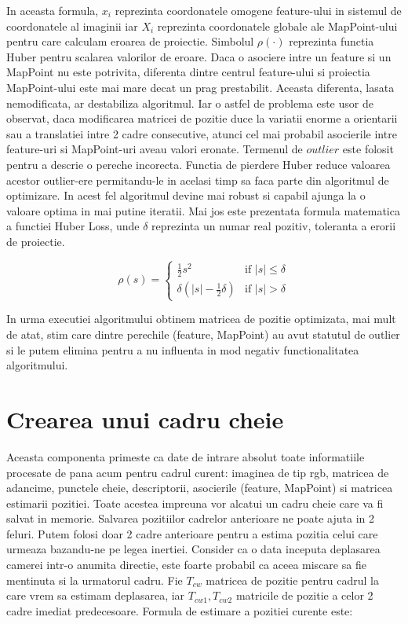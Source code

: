 \documentclass[12pt,a4paper]{report}
\begin{document}
In aceasta formula, \(x_i\) reprezinta coordonatele omogene feature-ului in sistemul de 
coordonatele al imaginii
iar \(X_i\) reprezinta coordonatele globale ale MapPoint-ului pentru care calculam eroarea
de proiectie. Simbolul $ \rho(\cdot) $ reprezinta functia Huber pentru scalarea valorilor de eroare.
Daca o asociere intre un feature si un MapPoint nu este potrivita, diferenta dintre centrul feature-ului
si proiectia MapPoint-ului este mai mare decat un prag prestabilit. Aceasta diferenta, lasata nemodificata,
ar destabiliza algoritmul. Iar o astfel de problema este usor de observat, daca modificarea matricei
de pozitie duce la variatii enorme a orientarii sau a translatiei intre 2 cadre consecutive, 
atunci cel mai probabil asocierile intre feature-uri si MapPoint-uri aveau valori eronate. 
Termenul de \(outlier\) este folosit pentru a descrie o pereche incorecta. Functia de pierdere Huber reduce 
valoarea acestor outlier-ere permitandu-le in acelasi timp sa faca parte din algoritmul de 
optimizare. In acest fel algoritmul devine mai robust si capabil ajunga la o valoare optima 
in mai putine iteratii. Mai jos este prezentata formula matematica a functiei Huber Loss, 
unde $ \delta $ reprezinta un numar real pozitiv, toleranta a erorii de proiectie. 

\begin{equation}
\rho(s) =
\begin{cases}
\frac{1}{2}s^2 & \text{if } |s| \leq \delta \\
\delta (|s| - \frac{1}{2}\delta) & \text{if } |s| > \delta
\end{cases}
\end{equation}

In urma executiei algoritmului obtinem matricea de pozitie optimizata, mai mult de atat,
stim care dintre perechile (feature, MapPoint) au avut statutul de outlier si le putem 
elimina pentru a nu influenta in mod negativ functionalitatea algoritmului.

\section{Crearea unui cadru cheie}
Aceasta componenta primeste ca date de intrare absolut toate informatiile procesate de 
pana acum pentru cadrul curent: imaginea de tip rgb, matricea de adancime, punctele cheie,
descriptorii, asocierile (feature, MapPoint) si matricea estimarii pozitiei. 
Toate acestea impreuna vor alcatui un cadru cheie care va fi salvat in memorie.
Salvarea pozitiilor cadrelor anterioare ne poate ajuta in 2 feluri. Putem folosi doar 2 
cadre anterioare pentru a estima pozitia celui care urmeaza bazandu-ne pe legea inertiei. 
Consider ca o data inceputa deplasarea camerei intr-o anumita directie, este foarte 
probabil ca aceea miscare sa fie mentinuta si la urmatorul cadru. Fie \(T_{cw}\) matricea de 
pozitie pentru cadrul la care vrem sa estimam deplasarea, iar \(T_{cw1}, T_{cw2} \) matricile 
de pozitie a celor 2 cadre imediat predecesoare. Formula de estimare a pozitiei curente este:
\end{document}

